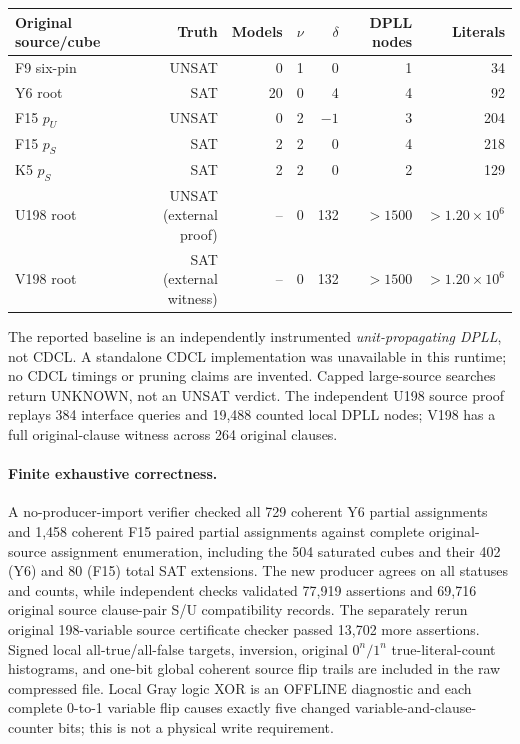 \documentclass[11pt]{article}
\begin{document}
\begin{center}\begin{tabular}{lrrrrrr}\toprule
Original source/cube&Truth&Models&$\nu$&$\delta$&DPLL nodes&Literals\\\midrule
F9 six-pin&UNSAT&0&1&0&1&34\\
Y6 root&SAT&20&0&4&4&92\\
F15 $p_U$&UNSAT&0&2&$-1$&3&204\\
F15 $p_S$&SAT&2&2&0&4&218\\
K5 $p_S$&SAT&2&2&0&2&129\\
U198 root&UNSAT (external proof)&--&0&132&$>1500$&$>1.20\times10^6$\\
V198 root&SAT (external witness)&--&0&132&$>1500$&$>1.20\times10^6$\\\bottomrule
\end{tabular}\end{center}
The reported baseline is an independently instrumented \emph{unit-propagating DPLL}, not CDCL. A standalone CDCL implementation was unavailable in this runtime; no CDCL timings or pruning claims are invented. Capped large-source searches return UNKNOWN, not an UNSAT verdict. The independent U198 source proof replays 384 interface queries and 19,488 counted local DPLL nodes; V198 has a full original-clause witness across 264 original clauses.

\paragraph{Finite exhaustive correctness.}
A no-producer-import verifier checked all 729 coherent Y6 partial assignments and 1,458 coherent F15 paired partial assignments against complete original-source assignment enumeration, including the 504 saturated cubes and their 402 (Y6) and 80 (F15) total SAT extensions. The new producer agrees on all statuses and counts, while independent checks validated 77,919 assertions and 69,716 original source clause-pair S/U compatibility records. The separately rerun original 198-variable source certificate checker passed 13,702 more assertions. Signed local all-true/all-false targets, inversion, original $0^n/1^n$ true-literal-count histograms, and one-bit global coherent source flip trails are included in the raw compressed file. Local Gray logic XOR is an OFFLINE diagnostic and each complete 0-to-1 variable flip causes exactly five changed variable-and-clause-counter bits; this is not a physical write requirement.
\end{document}

